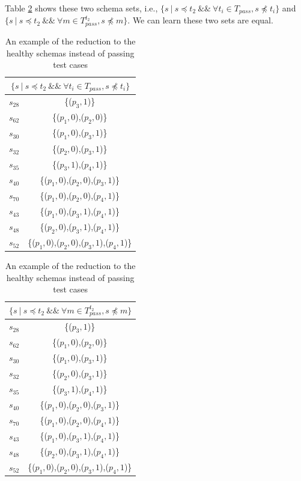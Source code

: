 Table \ref{ex:healthyintequal} shows these two schema sets, i.e., $\{ s\ |\ s \preceq t_{2}\ \&\&\  \forall t_{i} \in T_{pass}, s \npreceq t_{i} \} $ and $\{ s\ |\ s \preceq t_{2}\ \&\&\ \forall m \in T_{pass}^{t_{2}}, s \npreceq m \}$. We can learn these two sets are equal.

 \begin{table}[htbp]
  \centering
  \caption{An example of the reduction to the healthy schemas instead of passing test cases}
  \label{ex:healthyintequal}
    \begin{tabular}{|c|c|} \hline
     \multicolumn{2}{|c|}{$\{ s\ |\ s \preceq t_{2}\ \&\&\  \forall t_{i} \in T_{pass}, s \npreceq t_{i} \} $} \\ \hline
   $s_{28}$ & \{($p_{3}, 1$)\} \\
   $s_{62}$ & \{($p_{1}, 0$),($p_{2}, 0$)\} \\
   $s_{30}$ & \{($p_{1}, 0$),($p_{3}, 1$)\} \\
   $s_{32}$ & \{($p_{2}, 0$),($p_{3}, 1$)\} \\
   $s_{35}$ & \{($p_{3}, 1$),($p_{4}, 1$)\} \\
   $s_{40}$ & \{($p_{1}, 0$),($p_{2}, 0$),($p_{3}, 1$)\} \\
   $s_{70}$ & \{($p_{1}, 0$),($p_{2}, 0$),($p_{4}, 1$)\} \\
   $s_{43}$ & \{($p_{1}, 0$),($p_{3}, 1$),($p_{4}, 1$)\} \\
   $s_{48}$ & \{($p_{2}, 0$),($p_{3}, 1$),($p_{4}, 1$)\} \\
   $s_{52}$ & \{($p_{1}, 0$),($p_{2}, 0$),($p_{3}, 1$),($p_{4}, 1$)\} \\ \hline
    \end{tabular}%
\quad
    \begin{tabular}{|c|c|} \hline
   \multicolumn{2}{|c|}{$\{ s\ |\ s \preceq t_{2}\ \&\&\ \forall m \in T_{pass}^{t_{2}}, s \npreceq m \}$}\\ \hline
   $s_{28}$ & \{($p_{3}, 1$)\} \\
   $s_{62}$ & \{($p_{1}, 0$),($p_{2}, 0$)\} \\
   $s_{30}$ & \{($p_{1}, 0$),($p_{3}, 1$)\} \\
   $s_{32}$ & \{($p_{2}, 0$),($p_{3}, 1$)\} \\
   $s_{35}$ & \{($p_{3}, 1$),($p_{4}, 1$)\} \\
   $s_{40}$ & \{($p_{1}, 0$),($p_{2}, 0$),($p_{3}, 1$)\} \\
   $s_{70}$ & \{($p_{1}, 0$),($p_{2}, 0$),($p_{4}, 1$)\} \\
   $s_{43}$ & \{($p_{1}, 0$),($p_{3}, 1$),($p_{4}, 1$)\} \\
   $s_{48}$ & \{($p_{2}, 0$),($p_{3}, 1$),($p_{4}, 1$)\} \\
   $s_{52}$ & \{($p_{1}, 0$),($p_{2}, 0$),($p_{3}, 1$),($p_{4}, 1$)\} \\ \hline
    \end{tabular}%
\end{table}


